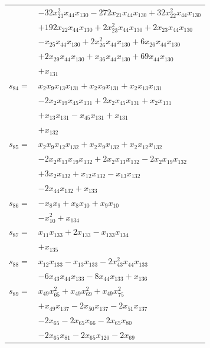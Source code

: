 \begin{longtable}{@{}r@{\;}l@{}}
 & \(\displaystyle -32x_{21}^{2}x_{44}x_{130} -272x_{21}x_{44}x_{130} +32x_{22}^{2}x_{44}x_{130}\) \\
 & \(\displaystyle +192x_{22}x_{44}x_{130} +2x_{23}^{2}x_{44}x_{130} +2x_{23}x_{44}x_{130}\) \\
 & \(\displaystyle -x_{25}x_{44}x_{130} +2x_{26}^{2}x_{44}x_{130} +6x_{26}x_{44}x_{130}\) \\
 & \(\displaystyle +2x_{29}x_{44}x_{130} +x_{36}x_{44}x_{130} +69x_{44}x_{130}\) \\
 & \(\displaystyle +x_{131}\) \\[3pt]
\(s_{84}=\) & \(\displaystyle x_{2}x_{9}x_{13}x_{131} +x_{2}x_{9}x_{131} +x_{2}x_{13}x_{131}\) \\
 & \(\displaystyle -2x_{2}x_{19}x_{45}x_{131} +2x_{2}x_{45}x_{131} +x_{2}x_{131}\) \\
 & \(\displaystyle +x_{13}x_{131} -x_{45}x_{131} +x_{131}\) \\
 & \(\displaystyle +x_{132}\) \\[3pt]
\(s_{85}=\) & \(\displaystyle x_{2}x_{9}x_{12}x_{132} +x_{2}x_{9}x_{132} +x_{2}x_{12}x_{132}\) \\
 & \(\displaystyle -2x_{2}x_{13}x_{19}x_{132} +2x_{2}x_{13}x_{132} -2x_{2}x_{19}x_{132}\) \\
 & \(\displaystyle +3x_{2}x_{132} +x_{12}x_{132} -x_{13}x_{132}\) \\
 & \(\displaystyle -2x_{44}x_{132} +x_{133}\) \\[3pt]
\(s_{86}=\) & \(\displaystyle -x_{8}x_{9} +x_{8}x_{10} +x_{9}x_{10}\) \\
 & \(\displaystyle -x_{10}^{2} +x_{134}\) \\[3pt]
\(s_{87}=\) & \(\displaystyle x_{11}x_{133} +2x_{133} -x_{133}x_{134}\) \\
 & \(\displaystyle +x_{135}\) \\[3pt]
\(s_{88}=\) & \(\displaystyle x_{12}x_{133} -x_{13}x_{133} -2x_{43}^{2}x_{44}x_{133}\) \\
 & \(\displaystyle -6x_{43}x_{44}x_{133} -8x_{44}x_{133} +x_{136}\) \\[3pt]
\(s_{89}=\) & \(\displaystyle x_{49}x_{65}^{2} +x_{49}x_{69}^{2} +x_{49}x_{75}^{2}\) \\
 & \(\displaystyle +x_{49}x_{137} -2x_{50}x_{137} -2x_{51}x_{137}\) \\
 & \(\displaystyle -2x_{65} -2x_{65}x_{66} -2x_{65}x_{80}\) \\
 & \(\displaystyle -2x_{65}x_{81} -2x_{65}x_{120} -2x_{69}\) \\

\end{longtable}
